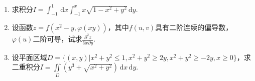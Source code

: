 \documentclass[../main.tex]{subfiles}
\begin{document}
\begin{enumerate}
    \item 求积分$I=\int_{-1}^{1}\,\mathrm{d}x\int_{-1}^{x}x\sqrt{1-x^{2}+y^{2}}\,\mathrm{d}
              y$.
          \vspace{11em}

    \item 设函数$z=f\left(x^{2}-y,\varphi(xy)\right)$，其中$f(u,v)$具有二阶连续的偏导数，$\varphi
              (u)$二阶可导，试求$\frac{\partial^{2} z}{\partial x \partial y}$.
          \vspace{11em}

    \item 设平面区域$D=\{(x,y)|x^{2}+y^{2}\leq 1,x^{2}+y^{2}\geq 2y,x^{2}+y^{2}\geq
              -2y, x\geq0\}$，求二重积分$I=\iint\limits_{D}\left(y^{3}+\sqrt{x^{2}+y^{2}}
              \right)\,\mathrm{d}x\,\mathrm{d}y$.
          \vspace{11em}
\end{enumerate}
\end{document}
